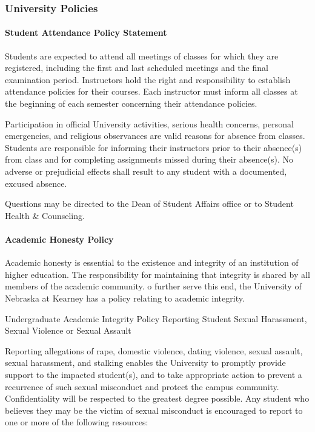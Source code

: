 \documentclass[12pt]{article}
\newcounter{ex}\setcounter{ex}{0}
\begin{document}
\subsubsection*{University Policies}

\paragraph*{Student Attendance Policy Statement}

Students are expected to attend all meetings of classes for which they are 
registered, including the first and last scheduled meetings and the final 
examination period. Instructors hold the right and responsibility to 
establish attendance policies for their courses. Each instructor must 
inform all classes at the beginning of each semester concerning their 
attendance policies.

Participation in official University activities, serious health concerns, 
personal emergencies, and religious observances are valid reasons for absence 
from classes. Students are responsible for informing their instructors prior 
to their absence(s) from class and for completing assignments missed during 
their absence(s). No adverse or prejudicial effects shall result to any student 
with a documented, excused absence.  

Questions may be directed to the Dean of Student Affairs office or to Student 
Health & Counseling.

\paragraph{Academic Honesty Policy} Academic honesty is essential to the existence 
and integrity of an institution of higher education.  The responsibility for 
maintaining that integrity is shared by all members of the academic community.  
o further serve this end, the University of Nebraska at Kearney has a policy 
relating to academic integrity.   

Undergraduate Academic Integrity Policy
Reporting Student Sexual Harassment, Sexual Violence or Sexual Assault

Reporting allegations of rape, domestic violence, dating violence, sexual assault, sexual harassment, and stalking enables the University to promptly provide support to the impacted student(s), and to take appropriate action to prevent a recurrence of such sexual misconduct and protect the campus community. Confidentiality will be respected to the greatest degree possible. Any student who believes they may be the victim of sexual misconduct is encouraged to report to one or more of the following resources:
\end{document}
